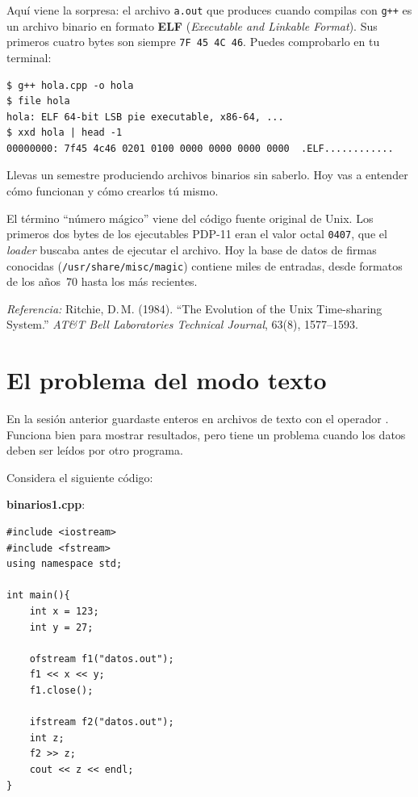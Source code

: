 \documentclass[12pt, oneside]{article}
\begin{document}
Aquí viene la sorpresa: el archivo \texttt{a.out} que produces cuando
compilas con \texttt{g++} es un archivo binario en formato \textbf{ELF}
(\textit{Executable and Linkable Format}).  Sus primeros cuatro bytes son
siempre \texttt{7F 45 4C 46}.  Puedes comprobarlo en tu terminal:

\begin{verbatim}
$ g++ hola.cpp -o hola
$ file hola
hola: ELF 64-bit LSB pie executable, x86-64, ...
$ xxd hola | head -1
00000000: 7f45 4c46 0201 0100 0000 0000 0000 0000  .ELF............
\end{verbatim}

Llevas un semestre produciendo archivos binarios sin saberlo.  Hoy vas a
entender cómo funcionan y cómo crearlos tú mismo.

\begin{tecnico}
  El término ``número mágico'' viene del código fuente original de Unix.
  Los primeros dos bytes de los ejecutables PDP-11 eran el valor octal
  \texttt{0407}, que el \textit{loader} buscaba antes de ejecutar el
  archivo.  Hoy la base de datos de firmas conocidas
  (\texttt{/usr/share/misc/magic}) contiene miles de entradas, desde
  formatos de los años~70 hasta los más recientes.
  \par\smallskip
  \textit{Referencia:} Ritchie, D.\,M. (1984). ``The Evolution of the
  Unix Time-sharing System.'' \textit{AT\&T Bell Laboratories Technical
  Journal}, 63(8), 1577--1593.
\end{tecnico}

\section{El problema del modo texto}

En la sesión anterior guardaste enteros en archivos de texto con el
operador \cpp{<<}.  Funciona bien para mostrar resultados, pero tiene un
problema cuando los datos deben ser leídos por otro programa.

Considera el siguiente código:

\textbf{binarios1.cpp}:
\begin{verbatim}
#include <iostream>
#include <fstream>
using namespace std;

int main(){
    int x = 123;
    int y = 27;

    ofstream f1("datos.out");
    f1 << x << y;
    f1.close();

    ifstream f2("datos.out");
    int z;
    f2 >> z;
    cout << z << endl;
}
\end{verbatim}
\end{document}

